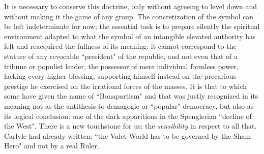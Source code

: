It is necessary to conserve this doctrine, only without agreeing to level down and without making it the game of any group. The concretization of the symbol can be left indeterminate for now; the essential task is to prepare silently the spiritual environment adapted to what the symbol of an intangible elevated authority has felt and reacquired the fullness of its meaning: it cannot correspond to the stature of any revocable ``president" of the republic, and not even that of a tribune or populist leader, the possessor of mere individual formless power, lacking every higher blessing, supporting himself instead on the precarious prestige he exercised on the irrational forces of the masses. It is that to which some have given the name of ``Bonapartism" and that was justly recognized in its meaning not as the antithesis to demagogic or ``popular" democracy, but also as its logical conclusion: one of the dark apparitions in the Spenglerian ``decline of the West". There is a new touchstone for us: the \emph{sensibility} in respect to all that. Carlyle had already written: ``the Valet-World has to be governed by the Sham-Hero" and not by a real Ruler.

